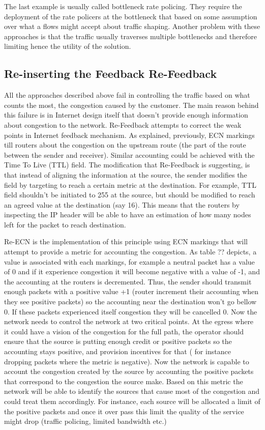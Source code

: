 The last example is usually called bottleneck rate policing. They require the deployment of the rate policers at the bottleneck that based on some assumption over what a flows might accept about traffic shaping. Another problem with these approaches is that the traffic usually traverses multiple bottlenecks and therefore limiting hence the utility of the solution.

\subsection{Re-inserting the Feedback Re-Feedback}
All the approaches described above fail in controlling the traffic based on what counts the most, the congestion caused by the customer. The main reason behind this failure is in Internet design itself that doesn't provide enough information about congestion to the network. Re-Feedback attempts to correct the weak points in Internet feedback mechanism. As explained, previously, ECN markings  till routers about the congestion on the upstream route (the part of the route between the sender and receiver). Similar accounting could be achieved with the Time To Live (TTL) field. The modification that Re-Feedback is suggesting, is that instead of aligning the information at the source, the sender modifies the field by targeting to reach a certain metric at the destination. For example, TTL field shouldn't be initiated  to 255 at the source, but should be modified to reach an agreed value at the destination (say 16). This means that the routers by inspecting the IP header will be able to have an estimation of how many nodes left for the packet to reach destination.

Re-ECN is the implementation of this principle using ECN markings that will attempt to provide a metric for accounting the congestion. As table ?? depicts, a value is associated with each markings, for example a neutral packet has a value of 0 and if it experience congestion it will become negative with a value of -1, and the accounting at the routers is decremented. Thus, the sender should transmit enough packets with a positive value +1 (router increment their accounting when they see positive packets) so the accounting near the destination won't go bellow 0. If these packets experienced itself congestion they will be cancelled 0. Now the network needs to control the network at two critical points. At the egress where it could have a vision of the congestion for the full path, the operator should ensure that the source is putting enough credit or positive packets so the accounting stays positive, and provision incentives for that ( for instance dropping packets  where the metric is negative). Now the network is capable to account the congestion created by the source by accounting the positive packets that correspond to the congestion the source make. Based on this metric the network will be able to identify the sources that cause most of the congestion and could treat them accordingly. For instance, each source will be allocated a limit of the positive packets and once it over pass this limit the quality of the service might drop (traffic policing, limited bandwidth etc.)

